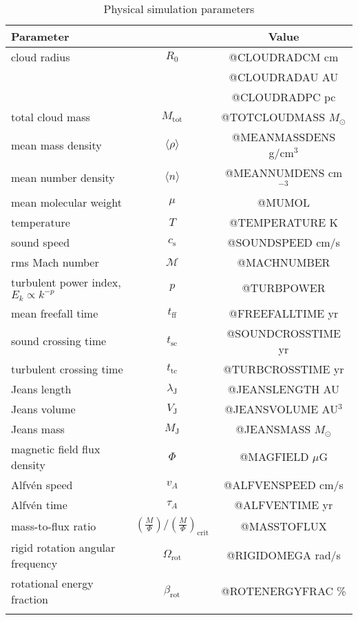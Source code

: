 \documentclass[letterpaper,11pt]{article}
\newcommand{\Msun}{M_\odot}
\begin{document}
\begin{table*}
\centering
\caption{Physical simulation parameters}
\begin{tabular*}{0.8\textwidth}{@{\extracolsep{\fill} } lcc}
\hline
Parameter & & Value \\
\hline
cloud radius     & $R_0$ &  @CLOUDRADCM   cm   \\
                 &       &  @CLOUDRADAU   AU   \\
                 &       &  @CLOUDRADPC   pc   \\
total cloud mass & $M_{\textrm{tot}}$ & @TOTCLOUDMASS  $\Msun$ \\
mean mass density & $\langle \rho \rangle$ & @MEANMASSDENS  g/cm$^3$ \\
mean number density & $\langle n \rangle$ &  @MEANNUMDENS  cm$^{-3}$\\
mean molecular weight & $\mu$ &  @MUMOL   \\
temperature & $T$ &  @TEMPERATURE  K \\
sound speed & $c_{\textrm{s}}$ &  @SOUNDSPEED  cm/s \\
rms Mach number & $\mathcal{M}$ & @MACHNUMBER   \\
turbulent power index, $E_k \propto k^{-p}$ & $p$ & @TURBPOWER   \\
mean freefall time      & $t_{\textrm{ff}}$ &  @FREEFALLTIME yr \\
sound crossing time     & $t_{\textrm{sc}}$ &  @SOUNDCROSSTIME yr \\
turbulent crossing time & $t_{\textrm{tc}}$ &  @TURBCROSSTIME yr \\
Jeans length & $\lambda_{\textrm{J}}$ &  @JEANSLENGTH AU \\
Jeans volume & $V_{\textrm{J}}$       &  @JEANSVOLUME AU$^3$\\
Jeans mass   & $M_{\textrm{J}}$       &  @JEANSMASS   $\Msun$ \\
magnetic field flux density & $\Phi$  &  @MAGFIELD  $\mu$G\\
Alfv\'{e}n speed & $v_A$ & @ALFVENSPEED cm/s \\
Alfv\'{e}n time  & $\tau_A$ & @ALFVENTIME yr \\
mass-to-flux ratio & $\left(\tfrac{M}{\Phi}\right)/\left(\tfrac{M}{\Phi}\right)_{\textrm{crit}}$ & @MASSTOFLUX  \\
rigid rotation angular frequency & $\Omega_{\textrm{rot}}$ & @RIGIDOMEGA rad/s \\
rotational energy fraction & $\beta_{\textrm{rot}}$ & @ROTENERGYFRAC \% \\
\hline \\
\end{tabular*}
\end{table*}
\end{document}
